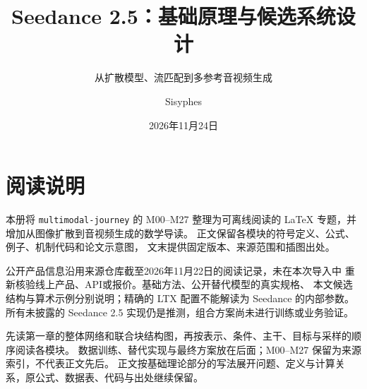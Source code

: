 \documentclass[lang=cn,newtx,10pt,scheme=chinese]{elegantbook}
\title{Seedance 2.5：基础原理与候选系统设计}
\subtitle{从扩散模型、流匹配到多参考音视频生成}
\author{Sisyphes}
\institute{AIGC 技术笔记}
\date{2026年11月24日}
\begin{document}
\maketitle
\frontmatter
\chapter*{阅读说明}
本册将 \texttt{multimodal-journey} 的 M00--M27 整理为可离线阅读的
\LaTeX{} 专题，并增加从图像扩散到音视频生成的数学导读。
正文保留各模块的符号定义、公式、例子、机制代码和论文示意图，
文末提供固定版本、来源范围和插图出处。

公开产品信息沿用来源仓库截至2026年11月22日的阅读记录，未在本次导入中
重新核验线上产品、API或报价。基础方法、公开替代模型的真实规格、
本文候选结构与算术示例分别说明；精确的 LTX 配置不能解读为 Seedance 的内部参数。
所有未披露的 Seedance 2.5 实现仍是推测，组合方案尚未进行训练或业务验证。

先读第一章的整体网络和联合块结构图，再按表示、条件、主干、目标与采样的顺序阅读各模块。
数据训练、替代实现与最终方案放在后面；M00--M27 保留为来源索引，不代表正文先后。
正文按基础理论部分的写法展开问题、定义与计算关系，原公式、数据表、代码与出处继续保留。
\tableofcontents
\mainmatter

\end{document}
